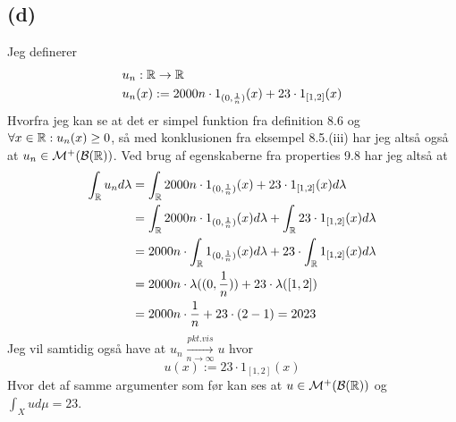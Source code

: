 \documentclass{article}
\begin{document}
\subsection*{(d)}
Jeg definerer
\begin{align*}
    &u_n : \mathbb{R} \to \mathbb{R} \\
    &u_n(x) := 2000n \cdot 1_{(0,\frac{1}{n})}(x) + 23 \cdot 1_{[1,2]}(x)
\end{align*}
Hvorfra jeg kan se at det er simpel funktion fra definition 8.6 \cite{lim} og 
$\forall x \in \mathbb{R} : u_n(x) \ge 0$, så med
konklusionen fra eksempel 8.5.(iii) har jeg altså også at $u_n \in \mathcal{M}^{+}(\mathcal{B}(\mathbb{R}))$.
Ved brug af egenskaberne fra properties 9.8 \cite{lim} har jeg altså at
\begin{align*}
    \int_{\mathbb{R}} u_n d \lambda
    &=\int_{\mathbb{R}} 2000n \cdot 1_{(0,\frac{1}{n})}(x) + 23 \cdot 1_{[1,2]}(x) d \lambda \\
    &=\int_{\mathbb{R}} 2000n \cdot 1_{(0,\frac{1}{n})}(x) d \lambda + \int_{\mathbb{R}} 23 \cdot 1_{[1,2]}(x) d \lambda \\
    &=2000n \cdot \int_{\mathbb{R}} 1_{(0,\frac{1}{n})}(x) d \lambda + 23 \cdot \int_{\mathbb{R}}  1_{[1,2]}(x) d \lambda \\
    &=2000n \cdot \lambda((0,\frac{1}{n})) + 23 \cdot \lambda([1,2]) \\
    &=2000n \cdot \frac{1}{n} + 23 \cdot (2-1) 
    =2023 
\end{align*}
Jeg vil samtidig også have at $u_n \overset{pkt. vis}{\underset{n \to \infty}{\longrightarrow}} u$ hvor
\[
    u(x) := 23 \cdot 1_{[1,2]}(x)
\]
Hvor det af samme argumenter som før kan ses at $u \in \mathcal{M}^{+}(\mathcal{B}(\mathbb{R}))$ 
og $\int_{X} u d \mu  = 23$.











{}

\end{document}
